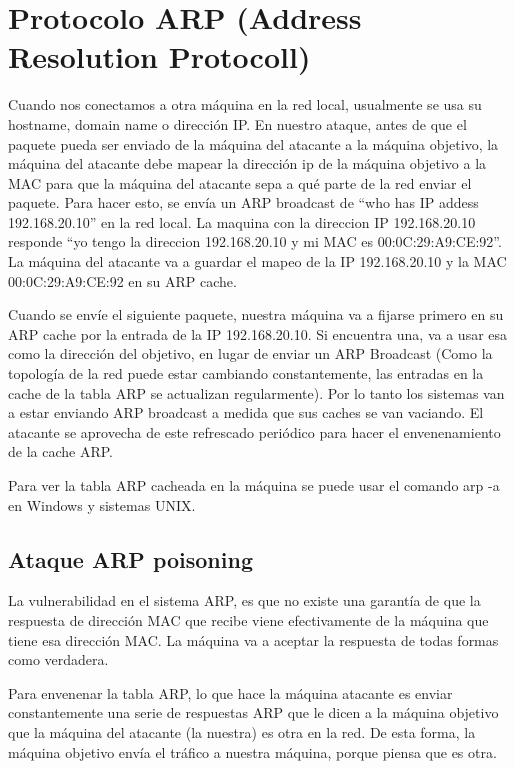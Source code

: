 \documentclass[a4paper, 13pt]{article}
\begin{document}
	\section{Protocolo ARP (Address Resolution Protocoll)}
	\par Cuando nos conectamos a otra máquina en la red local, usualmente se usa su hostname, domain name o dirección IP. En nuestro ataque, antes de que el paquete pueda ser enviado de la máquina del atacante a la máquina objetivo, la máquina del atacante debe mapear la dirección ip de la máquina objetivo a la MAC para que la máquina del atacante sepa a qué parte de la red enviar el paquete. Para hacer esto, se envía un ARP broadcast de “who has IP addess 192.168.20.10” en la red local. La maquina con la direccion IP 192.168.20.10 responde “yo tengo la direccion 192.168.20.10 y mi MAC es 00:0C:29:A9:CE:92”. La máquina del atacante va a guardar el mapeo de la IP 192.168.20.10 y la MAC 00:0C:29:A9:CE:92 en su ARP cache.
	
	\par Cuando se envíe el siguiente paquete, nuestra máquina va a fijarse primero en su ARP cache por la entrada de la IP 192.168.20.10. Si encuentra una, va a usar esa como la dirección del objetivo, en lugar de enviar un ARP Broadcast (Como la topología de la red puede estar cambiando constantemente, las entradas en la cache de la tabla ARP se actualizan regularmente). Por lo tanto los sistemas van a estar enviando ARP broadcast a medida que sus caches se van vaciando. El atacante se aprovecha de este refrescado periódico para hacer el envenenamiento de la cache ARP.
	
	\par Para ver la tabla ARP cacheada en la máquina se puede usar el comando arp -a en Windows y sistemas UNIX.
	
	\subsection{Ataque ARP poisoning}
	\par La vulnerabilidad en el sistema ARP, es que no existe una garantía de que la respuesta de dirección MAC que recibe viene efectivamente de la máquina que tiene esa dirección MAC. La máquina va a aceptar la respuesta de todas formas como verdadera.
	
	\par Para envenenar la tabla ARP, lo que hace la máquina atacante es enviar constantemente una serie de respuestas ARP que le dicen a la máquina objetivo que la máquina del atacante (la nuestra) es otra en la red. De esta forma, la máquina objetivo envía el tráfico a nuestra máquina, porque piensa que es otra.
	
\end{document}
